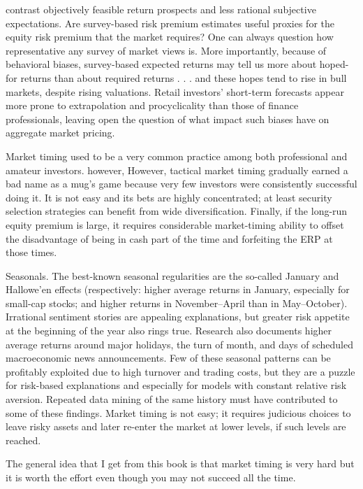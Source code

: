 \documentclass[12 pt]{article}
\begin{document}
contrast objectively feasible return prospects and less rational subjective expectations. Are survey-based risk premium estimates useful proxies for the equity risk premium that the market requires? One can always question how representative any survey of market views is. More importantly, because of behavioral biases, survey-based expected returns may tell us more about hoped-for returns than about required returns . . . and these hopes tend to rise in bull markets, despite rising valuations. Retail investors’ short-term forecasts appear more prone to extrapolation and procyclicality than those of finance professionals, leaving open the question of what impact such biases have on aggregate market pricing. 
\par Market timing used to be a very common practice among both professional and amateur investors. however, However, tactical market
timing gradually earned a bad name as a mug’s game because very few investors were consistently successful doing it. It is not easy and its bets are highly concentrated; at least security selection strategies can benefit from wide diversification. Finally, if the long-run equity premium is large, it requires considerable market-timing ability to offset the disadvantage of being in cash part of the time and forfeiting the ERP at those times.
\par Seasonals. The best-known seasonal regularities are the so-called January and Hallowe’en effects (respectively: higher average returns in January, especially for small-cap stocks; and higher returns in November–April than in May–October). Irrational sentiment stories are appealing explanations, but greater risk appetite at the beginning of the year also rings true. Research also documents higher average returns around major holidays, the turn of month, and days of scheduled macroeconomic news announcements. Few of these seasonal patterns can be profitably exploited due to high turnover and trading costs, but they are a puzzle for risk-based explanations and especially for models with constant relative risk aversion. Repeated data mining of the same history must have contributed to some of these findings. Market timing is not easy; it requires judicious choices to leave risky assets and later re-enter the market at lower levels, if such levels are reached.
\par The general idea that I get from this book is that market timing is very hard but it is worth the effort even though you may not succeed all the time. 
\end{document}
